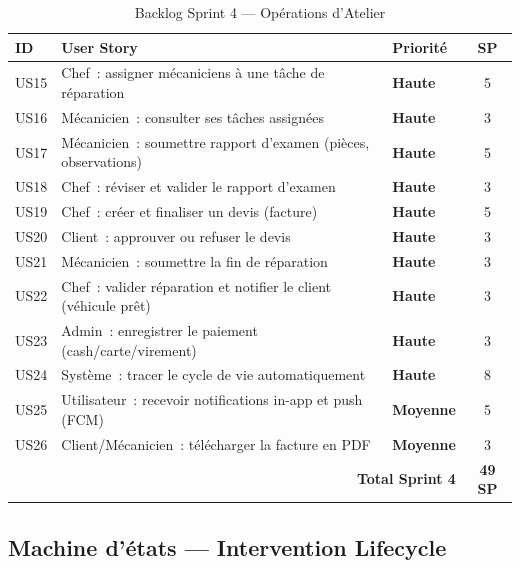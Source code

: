 \documentclass[12pt,a4paper]{report}
\begin{document}
\begin{table}[H]
\centering
\caption{Backlog Sprint 4 — Opérations d'Atelier}
\begin{tabularx}{\textwidth}{|l|X|l|c|}
\hline
\rowcolor{indigolite!60}
\textbf{ID} & \textbf{User Story} & \textbf{Priorité} & \textbf{SP} \\
\hline
US15 & Chef~: assigner mécaniciens à une tâche de réparation &
  \textcolor{prioH}{\bfseries Haute} & 5 \\
\hline
US16 & Mécanicien~: consulter ses tâches assignées &
  \textcolor{prioH}{\bfseries Haute} & 3 \\
\hline
US17 & Mécanicien~: soumettre rapport d'examen (pièces, observations) &
  \textcolor{prioH}{\bfseries Haute} & 5 \\
\hline
US18 & Chef~: réviser et valider le rapport d'examen &
  \textcolor{prioH}{\bfseries Haute} & 3 \\
\hline
US19 & Chef~: créer et finaliser un devis (facture) &
  \textcolor{prioH}{\bfseries Haute} & 5 \\
\hline
US20 & Client~: approuver ou refuser le devis &
  \textcolor{prioH}{\bfseries Haute} & 3 \\
\hline
US21 & Mécanicien~: soumettre la fin de réparation &
  \textcolor{prioH}{\bfseries Haute} & 3 \\
\hline
US22 & Chef~: valider réparation et notifier le client (véhicule prêt) &
  \textcolor{prioH}{\bfseries Haute} & 3 \\
\hline
US23 & Admin~: enregistrer le paiement (cash/carte/virement) &
  \textcolor{prioH}{\bfseries Haute} & 3 \\
\hline
US24 & Système~: tracer le cycle de vie automatiquement &
  \textcolor{prioH}{\bfseries Haute} & 8 \\
\hline
US25 & Utilisateur~: recevoir notifications in-app et push (FCM) &
  \textcolor{prioM}{\bfseries Moyenne} & 5 \\
\hline
US26 & Client/Mécanicien~: télécharger la facture en PDF &
  \textcolor{prioM}{\bfseries Moyenne} & 3 \\
\hline
\multicolumn{3}{|r|}{\textbf{Total Sprint 4}} & \textbf{49 SP} \\
\hline
\end{tabularx}
\end{table}

\subsection*{Machine d'états — Intervention Lifecycle}
\end{document}
